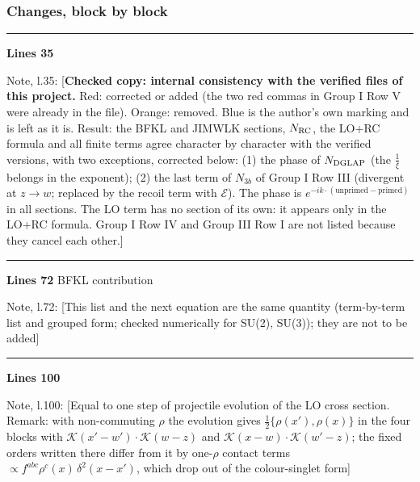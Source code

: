 \documentclass[10pt]{article}
\newenvironment{notebox}{\def\FrameCommand{{\color{notebar}\vrule width 1.5pt}\hspace{6pt}}\MakeFramed{\advance\hsize-\width\FrameRestore}\small}{\endMakeFramed}
\begin{document}
\subsubsection*{Changes, block by block}
\noindent\rule{\linewidth}{0.3pt}\par\noindent\textbf{Lines 35}\par
\begin{notebox}\textsf{\small Note, l.35:} [\textbf{Checked copy: internal consistency with the verified files of this project.} Red: corrected or added (the two red commas in Group I Row V were already in the file). Orange: removed. Blue is the author's own marking and is left as it is. Result: the BFKL and JIMWLK sections, $N_{\rm RC}$, the LO+RC formula and all finite terms agree character by character with the verified versions, with two exceptions, corrected below: (1) the phase of $N_{\rm DGLAP}$ (the $\frac{1}{\xi}$ belongs in the exponent); (2) the last term of $N_{3b}$ of Group I Row III (divergent at $z\to w$; replaced by the recoil term with $\mathcal{E}$). The phase is $e^{-ik\cdot(\text{unprimed}-\text{primed})}$ in all sections. The LO term has no section of its own: it appears only in the LO+RC formula. Group I Row IV and Group III Row I are not listed because they cancel each other.]\end{notebox}
\noindent\rule{\linewidth}{0.3pt}\par\noindent\textbf{Lines 72} \quad \textsf{BFKL contribution}\par
\begin{notebox}\textsf{\small Note, l.72:} [This list and the next equation are the same quantity (term-by-term list and grouped form; checked numerically for SU(2), SU(3)); they are not to be added]\end{notebox}
\noindent\rule{\linewidth}{0.3pt}\par\noindent\textbf{Lines 100}\par
\begin{notebox}\textsf{\small Note, l.100:} [Equal to one step of projectile evolution of the LO cross section. Remark: with non-commuting $\rho$ the evolution gives $\tfrac12\{\rho(x'),\rho(x)\}$ in the four blocks with $\mathcal{K}(x'-w')\cdot\mathcal{K}(w-z)$ and $\mathcal{K}(x-w)\cdot\mathcal{K}(w'-z)$; the fixed orders written there differ from it by one-$\rho$ contact terms $\propto f^{abc}\rho^{c}(x)\,\delta^{2}(x-x')$, which drop out of the colour-singlet form]\end{notebox}
\end{document}
